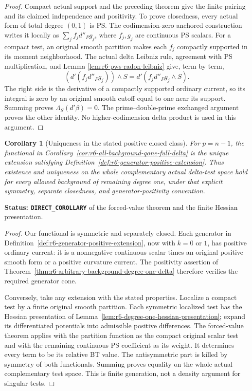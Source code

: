 \documentclass[11pt,a4paper]{article}
\numberwithin{equation}{section}
\newtheorem{corollary}[theorem]{Corollary}
\theoremstyle{definition}
\theoremstyle{remark}
\begin{document}
\begin{proof}
Compact actual support and the preceding theorem give the finite
pairing and its claimed independence and positivity.  To prove
closedness, every actual form of total degree $(0,1)$ is PS.
The codimension-zero anchored construction writes it locally as
$\sum_j f_jd''_P g_j$, where $f_j,g_j$ are continuous PS scalars.
For a compact test, an original smooth partition makes each $f_j$
compactly supported in its moment neighborhood.  The actual delta
Leibniz rule, agreement with PS multiplication, and Lemma
\ref{lem:r6-pws-radon-leibniz} give, term by term,
\[
        (d'(f_jd''_P g_j))\wedge S
                        =d'(f_jd''_P g_j\wedge S).
\]
The right side is the derivative of a compactly supported ordinary
current, so its integral is zero by an original smooth cutoff equal
to one near its support.  Summing proves $\Lambda_S(d'\beta)=0$.
The prime--double-prime exchanged argument proves the other identity.
No higher-codimension delta product is used in this argument.
\end{proof}

\begin{corollary}[Uniqueness in the stated positive closed class]
\label{cor:r6-qone-delta-extension-unique}
For $p=n-1$, the functional in
Corollary~\ref{cor:r6-all-background-qone-full-delta} is the unique
extension satisfying Definition~\ref{def:r6-generator-positive-extension}.
Thus existence and uniqueness on the whole complementary actual
delta-test space hold for every allowed background of remaining degree one,
under that explicit symmetry, separate closedness, and
generator-positivity convention.
\end{corollary}

\noindent\textbf{Status: \texttt{DIRECT\_COROLLARY}} of the forced-value
theorem and the finite Hessian presentation.

\begin{proof}
Our functional is symmetric and separately closed.  Each generator
in Definition~\ref{def:r6-generator-positive-extension}, now with
$k=0$ or $1$, has positive ordinary current: it is a nonnegative
continuous scalar times an original positive smooth form or a
positive curvature current.  The positivity assertion of
Theorem~\ref{thm:r6-arbitrary-background-degree-one-delta} therefore
verifies the required generator cone.

Conversely, take any extension with the stated properties.  Localize
a compact test by a finite original smooth partition.  Each symmetric
localized test has the Hessian presentation of
Lemma~\ref{lem:r6-degree-one-hessian-presentation}; expand its
differentiated potentials into admissible positive differences.
The forced-value theorem applies with the partition function as the
compact original scalar test and with the remaining continuous PS
coefficient as its weight.  It determines every term to be its
relative BT value.  The antisymmetric part is killed by symmetry of
both functionals.  Summing proves equality on the whole actual
complementary test space.  This is finite generation, not a density
argument for singular tests.
\end{proof}
\end{document}
